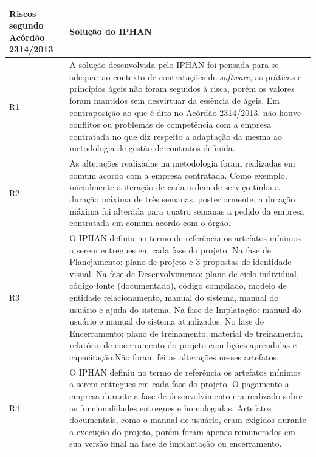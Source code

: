 \begin{longtable}{|p{2cm}|p{13cm}|}
\hline
\textbf{Riscos segundo Acórdão 2314/2013}                                                  & \textbf{Solução do IPHAN}                       \\ \hline
R1                                                                & A solução desenvolvida pelo IPHAN foi pensada para se adequar ao contexto de contratações de \textit{software}, as práticas e princípios ágeis não foram seguidos à risca, porém os valores foram mantidos sem desvirtuar da essência de ágeis. Em contraposição ao que é dito no Acórdão 2314/2013, não houve conflitos ou problemas de competência com a empresa contratada no que diz respeito a adaptação da mesma ao metodologia de gestão de contratos definida.          \\ \hline
R2                                                                &  As alterações realizadas na metodologia foram realizadas em comum acordo com a empresa contratada. Como exemplo, inicialmente a iteração de cada ordem de serviço tinha a duração máxima de três semanas, posteriormente, a duração máxima foi alterada para quatro semanas a pedido da empresa contratada em comum acordo com o órgão.               \\ \hline
R3                                                                & O IPHAN definiu no termo de referência os artefatos mínimos a serem entregues em cada fase do projeto. Na fase de Planejamento: plano de projeto e 3 propostas de identidade visual. Na fase de Desenvolvimento: plano de ciclo individual, código fonte (documentado), código compilado, modelo de entidade relacionamento, manual do sistema, manual do usuário e ajuda do sistema. Na fase de Implatação: manual do usuário e manual do sistema atualizados. No fase de Encerramento: plano de treinamento, material de treinamento, relatório de encerramento do projeto com lições aprendidas e capacitação.Não foram feitas alterações nesses artefatos.       \\ \hline
R4                                                                &  O IPHAN definiu no termo de referência os artefatos mínimos a serem entregues em cada fase do projeto. O pagamento a empresa durante a fase de desenvolvimento era realizado sobre as funcionalidades entregues e homologadas. Artefatos documentais, como o manual de usuário, eram exigidos durante a execução do projeto, porém foram apenas remunerados em sua versão final na fase de implantação ou encerramento.             \\ \hline

\end{longtable}
